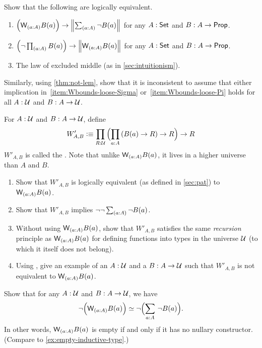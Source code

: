 \begin{ex}\label{ex:Wbounds-loose}
  Show that the following are logically equivalent.
  \begin{enumerate}
  \item $\Parens{\wtype{a:A} B(a)} \to \Brck{\sm{a:A} \neg B(a)}$ for any $A:\mathsf{Set}$ and $B:A\to \mathsf{Prop}$.\label{item:Wbounds-loose-Sigma}
  \item $\Parens{\neg \prd{a:A} B(a)} \to \Brck{\wtype{a:A} B(a)}$ for any $A:\mathsf{Set}$ and $B:A\to \mathsf{Prop}$.\label{item:Wbounds-loose-Pi}
  \item The law of excluded middle (as in \cref{sec:intuitionism}).
  \end{enumerate}
  Similarly, using \cref{thm:not-lem}, show that it is inconsistent to assume that either implication in~\ref{item:Wbounds-loose-Sigma} or~\ref{item:Wbounds-loose-Pi} holds for all $A:\mathcal{U}$ and $B:A\to \mathcal{U}$.
\end{ex}

\begin{ex}\label{ex:Wimpred}
  For $A:\mathcal{U}$ and $B:A\to \mathcal{U}$, define
  \[ W'_{A,B} \defeq \prd{R:\UU} \Parens{\prd{a:A} (B(a) \to R) \to R} \to R \]
  $W'_{A,B}$ is called the .
  Note that unlike $\wtype{a:A} B(a)$, it lives in a higher universe than $A$ and $B$.
  \begin{enumerate}
  \item Show that $W'_{A,B}$ is logically equivalent (as defined in \cref{sec:pat}) to $\wtype{a:A} B(a)$.
  \item Show that $W'_{A,B}$ implies $\neg\neg \sm{a:A} \neg B(a)$.
  \item Without using $\wtype{a:A} B(a)$, show that $W'_{A,B}$ satisfies the same \emph{recursion} principle as $\wtype{a:A} B(a)$ for defining functions into types in the universe $\mathcal{U}$ (to which it itself does not belong).
  \item Using \LEM, give an example of an $A:\mathcal{U}$ and a $B:A\to \mathcal{U}$ such that $W'_{A,B}$ is not equivalent to $\wtype{a:A} B(a)$.
  \end{enumerate}
\end{ex}

\begin{ex}\label{ex:no-nullary-constructor}
  Show that for any $A:\mathcal{U}$ and $B:A\to\mathcal{U}$, we have
  \[ \eqv{\neg\Parens{\wtype{a:A} B(a)}}{\neg\Parens{\sm{a:A} \neg B(a)}}. \]
  In other words, $\wtype{a:A} B(a)$ is empty if and only if it has no nullary constructor.
  (Compare to \cref{ex:empty-inductive-type}.)
\end{ex}

